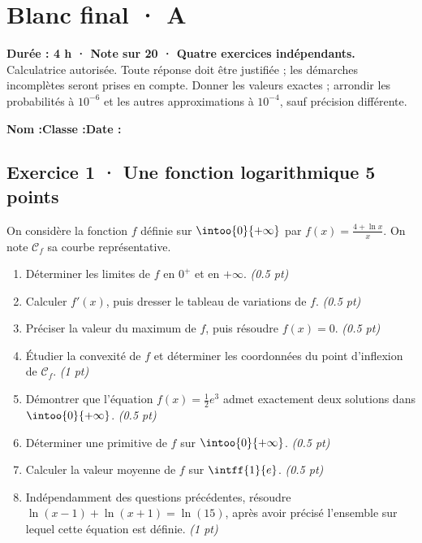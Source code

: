 \fi

\ifmxteacher

\mxnewpage{}\label{sujet:9-3}

\section*{Blanc final · A}


\textbf{Durée : 4 h · Note sur 20 · Quatre exercices indépendants.}\\Calculatrice autorisée. Toute réponse doit être justifiée ; les démarches incomplètes seront prises en compte. Donner les valeurs exactes ; arrondir les probabilités à $10^{-6}$ et les autres approximations à $10^{-4}$, sauf précision différente.

\smallskip\textbf{Nom :}\enspace\dotfill\quad\textbf{Classe :}\enspace\dotfill\quad\textbf{Date :}\enspace\dotfill

\subsection*{Exercice 1 · Une fonction logarithmique \hfill 5 points}On considère la fonction $f$ définie sur $\intoo{0}{+\infty}$ par $f(x)=\frac{4+\ln x}x$. On note $\mathcal C_f$ sa courbe représentative.

\begin{enumerate}

\item Déterminer les limites de $f$ en $0^+$ et en $+\infty$. \hfill\textit{(\num{0,5} pt)}

\item Calculer $f' (x)$, puis dresser le tableau de variations de $f$. \hfill\textit{(\num{0,5} pt)}

\item Préciser la valeur du maximum de $f$, puis résoudre $f(x)=0$. \hfill\textit{(\num{0,5} pt)}

\item Étudier la convexité de $f$ et déterminer les coordonnées du point d'inflexion de $\mathcal C_f$. \hfill\textit{(1 pt)}

\item Démontrer que l'équation $f(x)=\frac12 e^{3}$ admet exactement deux solutions dans $\intoo{0}{+\infty}$. \hfill\textit{(\num{0,5} pt)}

\item Déterminer une primitive de $f$ sur $\intoo{0}{+\infty}$. \hfill\textit{(\num{0,5} pt)}

\item Calculer la valeur moyenne de $f$ sur $\intff{1}{e}$. \hfill\textit{(\num{0,5} pt)}

\item Indépendamment des questions précédentes, résoudre $\ln(x-1)+\ln(x+1)=\ln(15)$, après avoir précisé l'ensemble sur lequel cette équation est définie. \hfill\textit{(1 pt)}

\end{enumerate}

